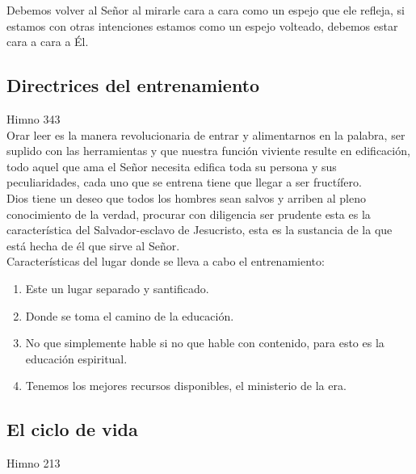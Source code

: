\documentclass[12pt]{article}
\begin{document}
Debemos volver al Señor al mirarle cara a cara como un espejo que ele refleja, si estamos con otras intenciones estamos como un espejo volteado, debemos estar cara a cara a Él.\\

\subsection*{Directrices del entrenamiento}

Himno 343\\

Orar leer es la manera revolucionaria de entrar y alimentarnos en la palabra, ser suplido con las herramientas y que nuestra función viviente resulte en edificación, todo aquel que ama el Señor necesita edifica toda su persona y sus peculiaridades, cada uno que se entrena tiene que llegar a ser fructífero.\\

Dios tiene un deseo que todos los hombres sean salvos y arriben al pleno conocimiento de la verdad, procurar con diligencia ser prudente esta es la característica del Salvador-esclavo de Jesucristo, esta es la sustancia de la que está hecha de él que sirve al Señor.\\

Características del lugar donde se lleva a cabo el entrenamiento:
\begin{enumerate}

\item Este un lugar separado y santificado.
\item Donde se toma el camino de la educación.
\item No que simplemente hable si no que hable con contenido, para esto es la educación espiritual.
\item Tenemos los mejores recursos disponibles, el ministerio de la era.

\end{enumerate}

\subsection*{El ciclo de vida}

Himno 213\\
\end{document}
